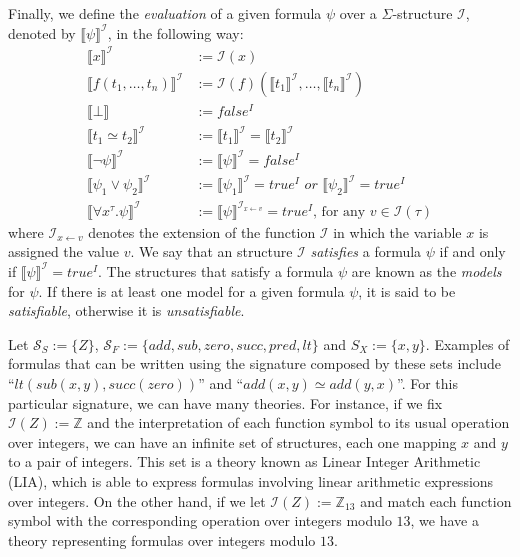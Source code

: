 Finally, we define the \textit{evaluation} of a given formula $\psi$ over a $\Sigma$-structure $\mathcal{I}$, denoted by $\llbracket \psi \rrbracket^{\mathcal{I}}$, in the following way:
\begin{align*}
  \llbracket x \rrbracket^{\mathcal{I}} &:= \mathcal{I}(x) \\
  \llbracket f(t_{1}, \ldots, t_{n}) \rrbracket^{\mathcal{I}} &:= \mathcal{I}(f)(\llbracket t_{1} \rrbracket^{\mathcal{I}}, \ldots, \llbracket t_{n} \rrbracket^{\mathcal{I}}) \\
  \llbracket \bot \rrbracket &:= false^{I} \\
  \llbracket t_{1} \simeq t_{2} \rrbracket^{\mathcal{I}} &:= \llbracket t_{1} \rrbracket^{\mathcal{I}} = \llbracket t_{2} \rrbracket^{\mathcal{I}} \\
  \llbracket \neg \psi \rrbracket^{\mathcal{I}} &:= \llbracket \psi \rrbracket^{\mathcal{I}} = false^{I} \\
  \llbracket \psi_{1} \vee \psi_{2} \rrbracket^{\mathcal{I}} &:= \llbracket \psi_{1} \rrbracket^{\mathcal{I}} = true^{I}\,\, or\,\, \llbracket \psi_{2} \rrbracket^{\mathcal{I}} = true^{I} \\
  \llbracket \forall x^{\tau} . \psi \rrbracket^{\mathcal{I}} &:= \llbracket \psi \rrbracket^{\mathcal{I}_{x \gets v}} = true^{I} \text{, for any } v \in \mathcal{I}(\tau)
\end{align*}
where $\mathcal{I}_{x \gets v}$ denotes the extension of the function $\mathcal{I}$ in which the variable $x$ is assigned the value $v$. We say that an structure $\mathcal{I}$ \textit{satisfies} a formula $\psi$ if and only if $\llbracket \psi \rrbracket^{\mathcal{I}} = true^{I}$. The structures that satisfy a formula $\psi$ are known as the \textit{models} for $\psi$. If there is at least
one model for a given formula $\psi$, it is said to be \textit{satisfiable}, otherwise it is \textit{unsatisfiable}.

\begin{example}[LIA]\label{ex:lia}
  Let $\mathcal{S}_{S} := \{Z\}$, $\mathcal{S}_{F} := \{add, sub, zero, succ, pred, lt\}$ and
  $S_{X} := \{x, y\}$. Examples of formulas that can be written using the signature composed by these sets include ``$lt(sub(x, y), succ(zero))$'' and ``$add(x, y) \simeq add(y, x)$''. For this particular signature, we can have many theories. For instance, if we fix $\mathcal{I}(Z) := \mathbb{Z}$ and the interpretation of each function symbol to its usual operation over integers, we can have an infinite set of structures, each one mapping $x$ and $y$ to a pair of integers. This set is a theory known as Linear Integer Arithmetic (LIA), which is able to express formulas involving
  linear arithmetic expressions over integers.
  On the other hand, if we let $\mathcal{I}(Z) := \mathbb{Z}_{13}$ and match each function symbol with the corresponding operation over integers modulo $13$, we have a theory representing formulas over integers modulo $13$.
\end{example}

